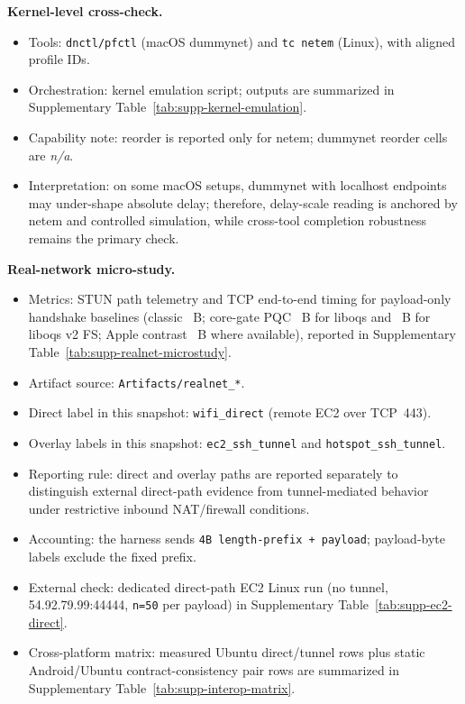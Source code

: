 \documentclass[10pt,journal,compsoc]{IEEEtran}
\providecommand{\tightlist}{%
  \setlength{\itemsep}{0pt}\setlength{\parskip}{0pt}}
\begin{document}
\textbf{Kernel-level cross-check.}
\begin{itemize}\tightlist
\item Tools: \texttt{dnctl/pfctl} (macOS dummynet) and \texttt{tc netem}
(Linux), with aligned profile IDs.
\item Orchestration: kernel emulation script; outputs
are summarized in Supplementary Table~\ref{tab:supp-kernel-emulation}.
\item Capability note: reorder is reported only for netem; dummynet
reorder cells are \textit{n/a}.
\item Interpretation: on some macOS setups, dummynet with localhost
endpoints may under-shape absolute delay; therefore, delay-scale reading
is anchored by netem and controlled simulation, while cross-tool
completion robustness remains the primary check.
\end{itemize}

\textbf{Real-network micro-study.}
\begin{itemize}\tightlist
\item Metrics: STUN path telemetry and TCP end-to-end timing for
payload-only handshake baselines (classic \claimClassicPayloadBytes~B; core-gate PQC \claimLiboqsPayloadBytes~B for liboqs and \claimLiboqsVTwoPayloadBytes~B for liboqs v2 FS; Apple contrast \claimCryptoKitPayloadBytes~B where available),
reported in Supplementary Table~\ref{tab:supp-realnet-microstudy}.
\item Artifact source: \texttt{Artifacts/realnet\_*}.
\item Direct label in this snapshot:
\texttt{wifi\_direct} (remote EC2 over TCP~443).
\item Overlay labels in this snapshot:
\texttt{ec2\_ssh\_tunnel} and \texttt{hotspot\_ssh\_tunnel}.
\item Reporting rule: direct and overlay paths are reported separately to
distinguish external direct-path evidence from tunnel-mediated behavior
under restrictive inbound NAT/firewall conditions.
\item Accounting: the harness sends \texttt{4B length-prefix + payload};
payload-byte labels exclude the fixed prefix.
\item External check: dedicated direct-path EC2 Linux run (no tunnel,
54.92.79.99:44444, \texttt{n=50} per payload) in Supplementary
Table~\ref{tab:supp-ec2-direct}.
\item Cross-platform matrix: measured Ubuntu direct/tunnel rows plus
static Android/Ubuntu contract-consistency pair rows are summarized in
Supplementary Table~\ref{tab:supp-interop-matrix}.
\end{itemize}
\end{document}
